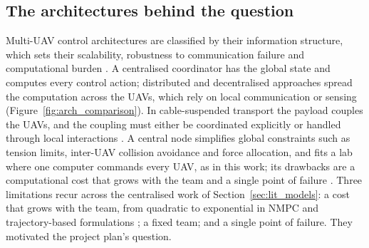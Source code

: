 
\subsection{The architectures behind the question}
\label{sec:app_network_lit}

Multi-UAV control architectures are classified by their information structure, which sets their scalability,
robustness to communication failure and computational burden \cite{nathanReviewAutonomousMultiagent2011}. A
centralised coordinator has the global state and computes every control action; distributed and decentralised
approaches spread the computation across the UAVs, which rely on local communication or sensing
(Figure~\ref{fig:arch_comparison}). In cable-suspended transport the payload couples the UAVs, and the coupling
must either be coordinated explicitly or handled through local interactions
\cite{brambillaSwarmRoboticsReview2013}. A central node simplifies global constraints such as tension limits,
inter-UAV collision avoidance and force allocation, and fits a lab where one computer commands every UAV, as in
this work; its drawbacks are a computational cost that grows with the team and a single point of failure
\cite{dimakosStudyCentralisedDecentralised2021}. Three limitations recur across the centralised work of
Section~\ref{sec:lit_models}: a cost that grows with the team, from quadratic \cite{efficient} to exponential in
NMPC and trajectory-based formulations \cite{tudelft}; a fixed team; and a single point of failure. They motivated
the project plan's question.

